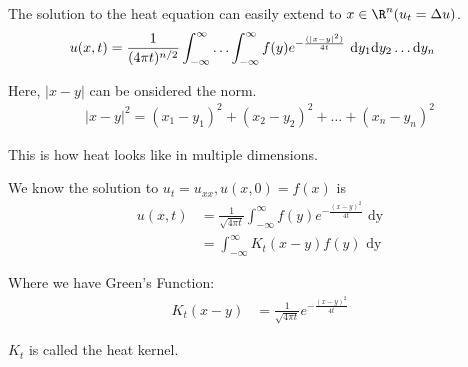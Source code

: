 \bigbreak


The solution to the heat equation can easily extend to $x \in \R^n (u_t = \Delta u)$.
%
\begin{align}
  u(x, t) & = \frac{1}{(4 \pi t)^{n/2}} \int^\infty_{-\infty} \ldots \int^\infty_{-\infty} f(y) e^{-\frac{(|x - y|^2)}{4t}} \text{ d}y_1 \text dy_2 \ldots \text dy_n
\end{align}

Here, $|x - y|$ can be onsidered the norm.
%
\begin{align}
  |x - y|^2 = (x_1 - y_1)^2 + (x_2 - y_2)^2 + \ldots + (x_n - y_n)^2
\end{align}

This is how heat looks like in multiple dimensions.

\bigbreak

We know the solution to $u_t = u_{xx}, u(x, 0) = f(x)$ is
%
\begin{align}
  u(x, t) & = \frac{1}{\sqrt{4 \pi t}} \int^\infty_{-\infty} f(y) e^{-\frac{(x - y)^2}{4 t}} \text{ dy}\\
  & = \int^\infty_{-\infty} K_t (x - y) f(y) \text{ dy}
\end{align}

Where we have Green's Function:
%
\begin{align}
  K_t(x - y) & = \frac{1}{\sqrt{4 \pi t}} e^{-\frac{(x - y)^2}{4t}}
\end{align}

$K_t$ is called the heat kernel.
